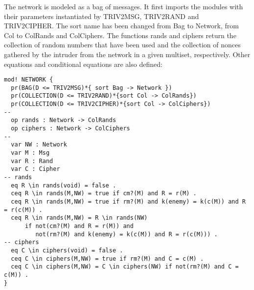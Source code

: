 \documentclass[a4paper,fleqn]{cas-dc}
\begin{document}
The network is modeled as a bag of messages. 
It first imports the modules with their parameters instantiated by TRIV2MSG, TRIV2RAND and TRIV2CIPHER. The sort name has been changed from Bag to Network, from
Col to ColRands and ColCiphers.
The functions rands and ciphers return the collection of random numbers that have been used and the collection of nonces gathered by
the intruder from the network in a given multiset, respectively. Other equations and conditional equations are also defined:
\begin{small}
\begin{verbatim}
mod! NETWORK {
  pr(BAG(D <= TRIV2MSG)*{ sort Bag -> Network })
  pr(COLLECTION(D <= TRIV2RAND)*{sort Col -> ColRands})
  pr(COLLECTION(D <= TRIV2CIPHER)*{sort Col -> ColCiphers})
--
  op rands : Network -> ColRands
  op ciphers : Network -> ColCiphers
--
  var NW : Network
  var M : Msg
  var R : Rand
  var C : Cipher
-- rands
  eq R \in rands(void) = false .
  ceq R \in rands(M,NW) = true if cm?(M) and R = r(M) .
  ceq R \in rands(M,NW) = true if rm?(M) and k(enemy) = k(c(M)) and R = r(c(M)) .
  ceq R \in rands(M,NW) = R \in rands(NW)
      if not(cm?(M) and R = r(M)) and
         not(rm?(M) and k(enemy) = k(c(M)) and R = r(c(M))) .
-- ciphers
  eq C \in ciphers(void) = false .
  ceq C \in ciphers(M,NW) = true if rm?(M) and C = c(M) .
  ceq C \in ciphers(M,NW) = C \in ciphers(NW) if not(rm?(M) and C = c(M)) .
}
\end{verbatim}
\end{small}
\end{document}
